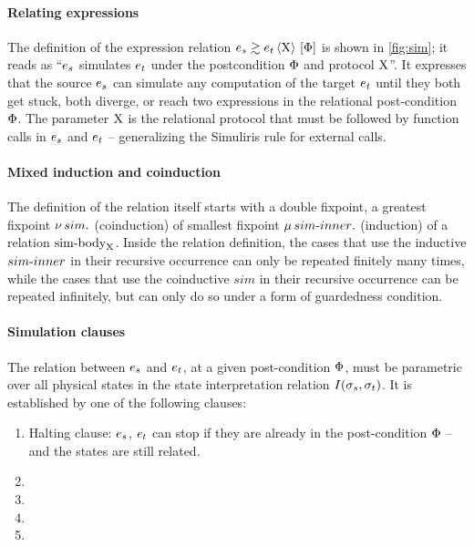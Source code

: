 \paragraph{Relating expressions} The definition of the expression relation $\iSim[\iProt]{\iPred}{\datalangExpr_s}{\datalangExpr_t}$ is shown in \cref{fig:sim}; it reads as ``$\datalangExpr_s$ simulates $\datalangExpr_t$ under the postcondition $\Phi$ and protocol $\mathrm{X}$''. It expresses that the source $\datalangExpr_s$ can simulate any computation of the target $\datalangExpr_t$ until they both get stuck, both diverge, or reach two expressions in the relational post-condition $\Phi$. The parameter $\mathrm{X}$ is the relational protocol that must be followed by function calls in $\datalangExpr_s$ and $\datalangExpr_t$ -- generalizing the Simuliris rule for external calls.

\paragraph{Mixed induction and coinduction}
The definition of the relation itself starts with a double fixpoint, a greatest fixpoint $\operatorname{\nu} sim .$ (coinduction) of smallest fixpoint $\operatorname{\mu} {sim {\hbox{-}} inner} .$ (induction) of a relation $\mathrm{sim {\hbox{-}} body}_{\mathrm{X}}$. Inside the relation definition, the cases that use the inductive $sim {\hbox{-}} inner$ in their recursive occurrence can only be repeated finitely many times, while the cases that use the coinductive $sim$ in their recursive occurrence can be repeated infinitely, but can only do so under a form of guardedness condition.

\paragraph{Simulation clauses} The relation between $\datalangExpr_s$ and $\datalangExpr_t$, at a given post-condition $\Phi$, must be parametric over all physical states in the state interpretation relation $I(\datalangState_s, \datalangState_t)$. It is established by one of the following clauses:

\begin{enumerate}
\item[\circled{1}] Halting clause: $\datalangExpr_s$, $\datalangExpr_t$ can stop if they are already in the post-condition $\Phi$ -- and the states are still related.
\item[\circled{2}]
\item[\circled{3}]
\item[\circled{4}]
\item[\circled{5}]
\end{enumerate}

